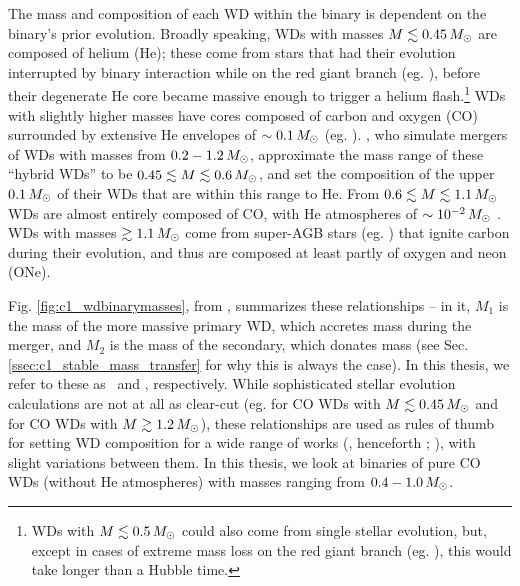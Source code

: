 
The mass and composition of each WD within the binary is dependent on the binary's prior evolution.  Broadly speaking, WDs with masses $M \lesssim 0.45\,\Msun$ are composed of helium (He); these come from stars that had their evolution interrupted by binary interaction while on the red giant branch (eg. \citealt{mars95, nele+01a, podsrp02, nelsdm04}), before their degenerate He core became massive enough to trigger a helium flash.\footnote{WDs with $M\lesssim0.5\,\Msun$ could also come from single stellar evolution, but, except in cases of extreme mass loss on the red giant branch (eg. \citealt{kali+07}), this would take longer than a Hubble time.}  WDs with slightly higher masses have cores composed of carbon and oxygen (CO) surrounded by extensive He envelopes of $\sim0.1\,\Msun$ (eg. \citealt{ibent85, nele+01a, podsrp02}).  \cite{dan+12}, who simulate mergers of WDs with masses from $0.2 - 1.2\,\Msun$, approximate the mass range of these ``hybrid WDs'' to be $0.45 \lesssim M \lesssim 0.6\,\Msun$, and set the composition of the upper $0.1\,\Msun$ of their WDs that are within this range to He.  From $0.6 \lesssim M \lesssim 1.1\,\Msun$ WDs are almost entirely composed of CO, with He atmospheres of $\sim10^{-2}\,\Msun$ \citep{ibent85}.  WDs with masses $\gtrsim 1.1\,\Msun$ come from super-AGB stars (eg. \citealt{herw05, garc13}) that ignite carbon during their evolution, and thus are composed at least partly of oxygen and neon (ONe).  

Fig. \ref{fig:c1_wdbinarymasses}, from \cite{dan+12}, summarizes these relationships -- in it, $M_1$ is the mass of the more massive primary WD, which accretes mass during the merger, and $M_2$ is the mass of the secondary, which donates mass (see Sec. \ref{ssec:c1_stable_mass_transfer} for why this is always the case).  In this thesis, we refer to these as \Ma\ and \Md, respectively.  While sophisticated stellar evolution calculations are not at all as clear-cut (eg. \citealt{ibent85, moros09} for CO WDs with $M\lesssim0.45\,\Msun$ and \citealt{hurlpt00} for CO WDs with $M\gtrsim1.2\,\Msun$), these relationships are used as rules of thumb for setting WD composition for a wide range of works (\citealt{loreig09}, henceforth \citeal{loreig09}; \citealt{rask+12,dan+12,dan+14}), with slight variations between them.  In this thesis, we look at binaries of pure CO WDs (without He atmospheres) with masses ranging from $0.4 - 1.0\,\Msun$.

